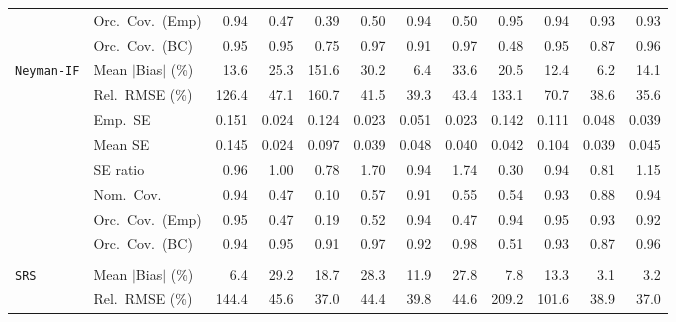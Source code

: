 \begin{landscape}
\begin{longtable}{llrrrrrrrrrr}
 & Orc.\ Cov.\ (Emp) & \cellcolor{ranktwo}0.94 & 0.47 & 0.39 & 0.50 & \cellcolor{ranktwo}0.94 & 0.50 & \cellcolor{rankone}0.95 & \cellcolor{ranktwo}0.94 & \cellcolor{rankthree}0.93 & \cellcolor{rankthree}0.93 \\
 & Orc.\ Cov.\ (BC) & \cellcolor{rankone}0.95 & \cellcolor{rankone}0.95 & 0.75 & \cellcolor{rankthree}0.97 & 0.91 & \cellcolor{rankthree}0.97 & 0.48 & \cellcolor{rankone}0.95 & 0.87 & \cellcolor{ranktwo}0.96 \\
\addlinespace[2pt]
\quad \texttt{Neyman-IF} & Mean $|$Bias$|$ (\%) & 13.6 & 25.3 & 151.6 & 30.2 & \cellcolor{ranktwo}6.4 & 33.6 & 20.5 & \cellcolor{rankthree}12.4 & \cellcolor{rankone}6.2 & 14.1 \\
 & Rel.\ RMSE (\%) & 126.4 & 47.1 & 160.7 & 41.5 & \cellcolor{rankthree}39.3 & 43.4 & 133.1 & 70.7 & \cellcolor{ranktwo}38.6 & \cellcolor{rankone}35.6 \\
 & Emp.\ SE & 0.151 & 0.024 & 0.124 & 0.023 & 0.051 & 0.023 & 0.142 & 0.111 & 0.048 & 0.039 \\
 & Mean SE & 0.145 & 0.024 & 0.097 & 0.039 & 0.048 & 0.040 & 0.042 & 0.104 & 0.039 & 0.045 \\
 & SE ratio & \cellcolor{ranktwo}0.96 & \cellcolor{rankone}1.00 & 0.78 & 1.70 & \cellcolor{rankthree}0.94 & 1.74 & 0.30 & \cellcolor{rankthree}0.94 & 0.81 & 1.15 \\
 & Nom.\ Cov. & \cellcolor{rankone}0.94 & 0.47 & 0.10 & 0.57 & \cellcolor{rankthree}0.91 & 0.55 & 0.54 & \cellcolor{ranktwo}0.93 & 0.88 & \cellcolor{rankone}0.94 \\
 & Orc.\ Cov.\ (Emp) & \cellcolor{rankone}0.95 & 0.47 & 0.19 & 0.52 & \cellcolor{ranktwo}0.94 & 0.47 & \cellcolor{ranktwo}0.94 & \cellcolor{rankone}0.95 & \cellcolor{rankthree}0.93 & 0.92 \\
 & Orc.\ Cov.\ (BC) & \cellcolor{ranktwo}0.94 & \cellcolor{rankone}0.95 & 0.91 & \cellcolor{rankthree}0.97 & 0.92 & 0.98 & 0.51 & \cellcolor{rankthree}0.93 & 0.87 & \cellcolor{ranktwo}0.96 \\
\addlinespace[2pt]
\multicolumn{12}{l}{\textbf{Binary \& Categorical Phase-One Covariates}} \\
\addlinespace[2pt]
\quad \texttt{SRS} & Mean $|$Bias$|$ (\%) & \cellcolor{rankthree}6.4 & 29.2 & 18.7 & 28.3 & 11.9 & 27.8 & 7.8 & 13.3 & \cellcolor{rankone}3.1 & \cellcolor{ranktwo}3.2 \\
 & Rel.\ RMSE (\%) & 144.4 & 45.6 & \cellcolor{rankone}37.0 & 44.4 & \cellcolor{rankthree}39.8 & 44.6 & 209.2 & 101.6 & \cellcolor{ranktwo}38.9 & \cellcolor{rankone}37.0 \\

\end{longtable}
\end{landscape}
